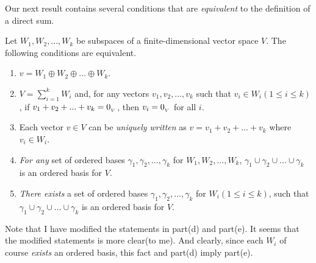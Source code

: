 Our next result contains several conditions that are \emph{equivalent} to the definition of a direct sum.

\begin{theorem} \label{thm 5.9}
Let \(W_1, W_2, ..., W_k\) be subspaces of a finite-dimensional vector space \(V\).
The following conditions are equivalent.

\begin{enumerate}
\item \(v = W_1 \oplus W_2 \oplus ... \oplus W_k\).
\item \(V = \sum_{i = 1}^k W_i\) and, for any vectors \(v_1, v_2, ..., v_k\) such that \(v_i \in W_i
(1 \le i \le k)\), if \(v_1 + v_2 + ... + v_k = 0_{_V}\), then \(v_i = 0_{_V}\) for all \(i\).
\item Each vector \(v \in V\) can be \emph{uniquely written} as \(v = v_1 + v_2 + ... + v_k\) where \(v_i \in W_i\).
\item\RED{*} \emph{For any} set of ordered bases \(\gamma_1, \gamma_2, ..., \gamma_k\) for \(W_1, W_2, ..., W_k\), \(\gamma_1 \cup \gamma_2 \cup ... \cup \gamma_k\) is an ordered basis for \(V\).
\item\RED{**} \emph{There exists} a set of ordered bases \(\gamma_1, \gamma_2, ..., \gamma_k\) for \(W_i (1 \le i \le k)\), such that \(\gamma_1 \cup \gamma_2 \cup ... \cup \gamma_k\) is an ordered basis for \(V\).
\end{enumerate}
\end{theorem}

\begin{remark} \label{remark 5.2.8}
Note that I have modified the statements in part(d) and part(e).
It seems that the modified statements is more clear(to me).
And clearly, since each \(W_i\) of course \emph{exists} an ordered basis, this fact and part(d) imply part(e).
\end{remark}

